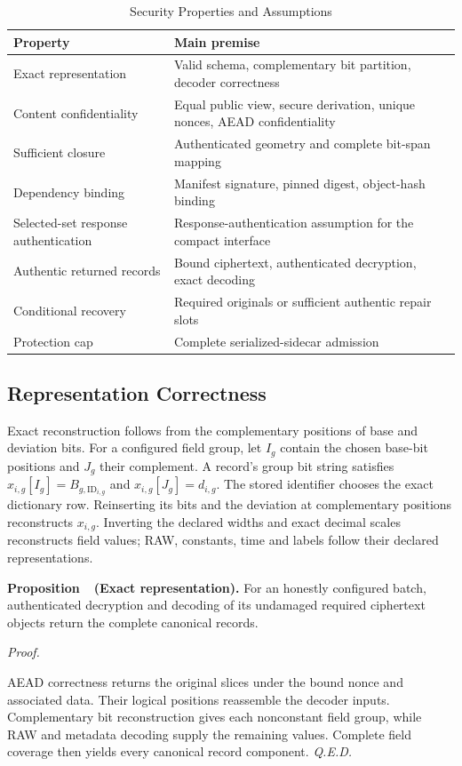 \documentclass[10pt,journal]{IEEEtran}
\newcounter{proposition}
\newenvironment{proposition}[1]{%
  \refstepcounter{proposition}\par\smallskip\noindent
  \textbf{Proposition~\theproposition\ (#1). }\ignorespaces
}{\par\smallskip}
\newenvironment{claimproof}{\par\noindent\emph{Proof. }\ignorespaces
}{\hfill\textit{Q.E.D.}\par\smallskip}
\begin{document}
\begin{table}[t]\centering\small
\caption{Security Properties and Assumptions}\label{tab:security}
\begin{tabular}{@{}>{\raggedright\arraybackslash}p{}>{\raggedright\arraybackslash}p{}@{}}\toprule
Property & Main premise\\\midrule
Exact representation & Valid schema, complementary bit partition, decoder correctness\\
Content confidentiality & Equal public view, secure derivation, unique nonces, AEAD confidentiality\\
Sufficient closure & Authenticated geometry and complete bit-span mapping\\
Dependency binding & Manifest signature, pinned digest, object-hash binding\\
Selected-set response authentication & Response-authentication assumption for the compact interface\\
Authentic returned records & Bound ciphertext, authenticated decryption, exact decoding\\
Conditional recovery & Required originals or sufficient authentic repair slots\\
Protection cap & Complete serialized-sidecar admission\\\bottomrule
\end{tabular}\end{table}

\subsection{Representation Correctness}\label{sec:representation-proof}
Exact reconstruction follows from the complementary positions of base and
deviation bits. For a configured field group, let $I_g$ contain the chosen base-bit positions
and $J_g$ their complement. A record's group bit string satisfies
$x_{i,g}[I_g]=B_{g,\mathrm{ID}_{i,g}}$ and
$x_{i,g}[J_g]=d_{i,g}$. The stored identifier chooses the exact dictionary
row. Reinserting its bits and the deviation at complementary positions
reconstructs $x_{i,g}$. Inverting the declared widths and exact decimal
scales reconstructs field values; RAW, constants, time and labels follow
their declared representations.

\begin{proposition}{Exact representation}\label{prop:representation}
For an honestly configured batch, authenticated decryption and decoding of
its undamaged required ciphertext objects return the complete canonical records.
\end{proposition}
\begin{claimproof}
AEAD correctness returns the original slices under the bound nonce and
associated data. Their logical positions reassemble the decoder inputs.
Complementary bit reconstruction gives each nonconstant field group, while
RAW and metadata decoding supply the remaining values. Complete field
coverage then yields every canonical record component.
\end{claimproof}
\end{document}
